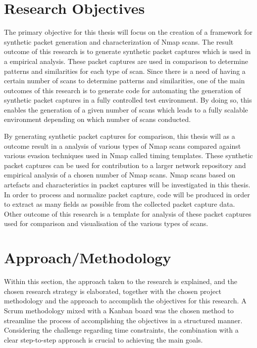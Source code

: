 \section{Research Objectives}
\label{s:IntroResearchObjectives}
The primary objective for this thesis will focus on the creation of a framework for synthetic packet generation and characterization of Nmap scans.
The result outcome of this research is to generate synthetic packet captures which is used in a empirical analysis.
These packet captures are used in comparison to determine patterns and similarities for each type of scan.
Since there is a need of having a certain number of scans to determine patterns and similarities, one of the main outcomes of this research is to generate code for automating the generation of synthetic packet captures in a fully controlled test environment. By doing so, this enables the generation of a given number of scans which leads to a fully scalable environment depending on which number of scans conducted.

By generating synthetic packet captures for comparison, this thesis will as a outcome result in a analysis of various types of Nmap scans compared against various evasion techniques used in Nmap called timing templates. These synthetic packet captures can be used for contribution to a larger network repository and empirical analysis of a chosen number of Nmap scans.
Nmap scans based on artefacts and characteristics in packet captures will be investigated in this thesis.
In order to process and normalize packet capture, code will be produced in order to extract as many fields as possible from the collected packet capture data.
Other outcome of this research is a template for analysis of these packet captures used for comparison and visualisation of the various types of scans.


\section{Approach/Methodology}
\label{s:ApproachMethodology}
Within this section, the approach taken to the research is explained, and the chosen research strategy is elaborated, together with the chosen project methodology and the approach to accomplish the objectives for this research.
A Scrum methodology mixed with a Kanban board was the chosen method to streamline the process of accomplishing the objectives in a structured manner.
Considering the challenge regarding time constraints, the combination with a clear step-to-step approach is crucial to achieving the main goals.



